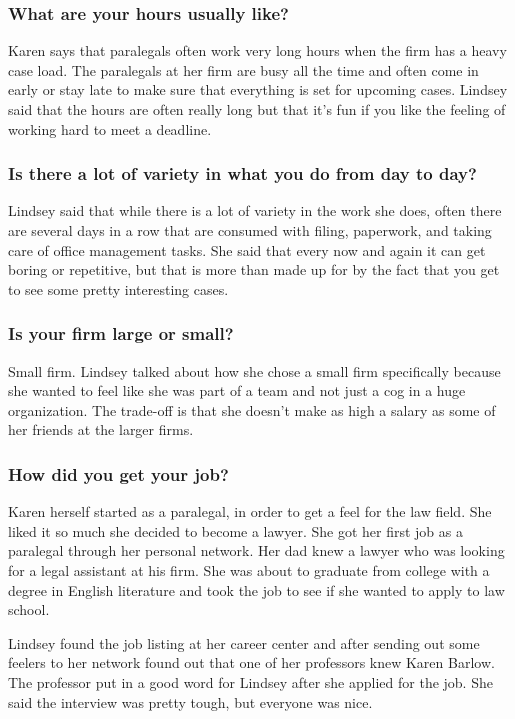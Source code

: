 \subsubsection*{What are your hours usually like?}

Karen says that paralegals often work very long hours when the firm has a heavy case load. The paralegals at her firm are busy all the time and often come in early or stay late to make sure that everything is set for upcoming cases. Lindsey said that the hours are often really long but that it's fun if you like the feeling of working hard to meet a deadline.

\subsubsection*{Is there a lot of variety in what you do from day to day? }

Lindsey said that while there is a lot of variety in the work she does, often there are several days in a row that are consumed with filing, paperwork, and taking care of office management tasks. She said that every now and again it can get boring or repetitive, but that is more than made up for by the fact that you get to see some pretty interesting cases.

\subsubsection*{Is your firm large or small?}

Small firm. Lindsey talked about how she chose a small firm specifically because she wanted to feel like she was part of a team and not just a cog in a huge organization. The trade-off is that she doesn't make as high a salary as some of her friends at the larger firms.

\subsubsection*{How did you get your job?}

Karen herself started as a paralegal, in order to get a feel for the law field. She liked it so much she decided to become a lawyer. She got her first job as a paralegal through her personal network. Her dad knew a lawyer who was looking for a legal assistant at his firm. She was about to graduate from college with a degree in English literature and took the job to see if she wanted to apply to law school.

Lindsey found the job listing at her career center and after sending out some feelers to her network found out that one of her professors knew Karen Barlow. The professor put in a good word for Lindsey after she applied for the job. She said the interview was pretty tough, but everyone was nice.

